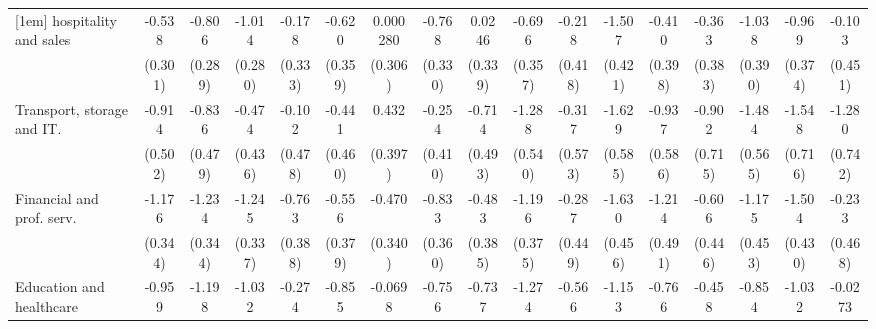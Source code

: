 {\begin{tabular}{l*{16}{c}}
[1em]
hospitality and sales&      -0.538         &      -0.806\sym{**} &      -1.014\sym{***}&      -0.178         &      -0.620         &    0.000280         &      -0.768\sym{*}  &      0.0246         &      -0.696         &      -0.218         &      -1.507\sym{***}&      -0.410         &      -0.363         &      -1.038\sym{**} &      -0.969\sym{**} &      -0.103         \\
                    &     (0.301)         &     (0.289)         &     (0.280)         &     (0.333)         &     (0.359)         &     (0.306)         &     (0.330)         &     (0.339)         &     (0.357)         &     (0.418)         &     (0.421)         &     (0.398)         &     (0.383)         &     (0.390)         &     (0.374)         &     (0.451)         \\
[1em]
Transport, storage and IT.&      -0.914         &      -0.836         &      -0.474         &      -0.102         &      -0.441         &       0.432         &      -0.254         &      -0.714         &      -1.288\sym{*}  &      -0.317         &      -1.629\sym{**} &      -0.937         &      -0.902         &      -1.484\sym{**} &      -1.548\sym{*}  &      -1.280         \\
                    &     (0.502)         &     (0.479)         &     (0.436)         &     (0.478)         &     (0.460)         &     (0.397)         &     (0.410)         &     (0.493)         &     (0.540)         &     (0.573)         &     (0.585)         &     (0.586)         &     (0.715)         &     (0.565)         &     (0.716)         &     (0.742)         \\
[1em]
Financial and prof. serv.&      -1.176\sym{***}&      -1.234\sym{***}&      -1.245\sym{***}&      -0.763\sym{*}  &      -0.556         &      -0.470         &      -0.833\sym{*}  &      -0.483         &      -1.196\sym{**} &      -0.287         &      -1.630\sym{***}&      -1.214\sym{*}  &      -0.606         &      -1.175\sym{**} &      -1.504\sym{***}&      -0.233         \\
                    &     (0.344)         &     (0.344)         &     (0.337)         &     (0.388)         &     (0.379)         &     (0.340)         &     (0.360)         &     (0.385)         &     (0.375)         &     (0.449)         &     (0.456)         &     (0.491)         &     (0.446)         &     (0.453)         &     (0.430)         &     (0.468)         \\
[1em]
Education and healthcare&      -0.959\sym{**} &      -1.198\sym{***}&      -1.032\sym{**} &      -0.274         &      -0.855\sym{*}  &     -0.0698         &      -0.756\sym{*}  &      -0.737\sym{*}  &      -1.274\sym{***}&      -0.566         &      -1.153\sym{**} &      -0.766         &      -0.458         &      -0.854\sym{*}  &      -1.032\sym{**} &     -0.0273         \\

\end{tabular}}

